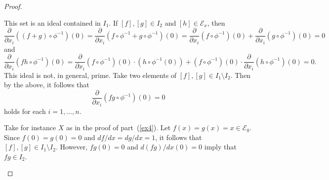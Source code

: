 \documentclass[10pt]{amsart}
\begin{document}
\begin{thm}
\begin{proof}
\begin{enumerate}
      This set is an ideal contained in $I_1$.
      If $[f], [g] \in I_2$ and $[h] \in \mathcal{E}_x$, then
      $$\frac{\partial}{\partial x_i}((f + g) \circ \phi^{-1})(0) = \frac{\partial}{\partial x_i}(f\circ \phi^{-1} + g \circ \phi^{-1})(0) = \frac{\partial}{\partial x_i}(f \circ \phi^{-1})(0) + \frac{\partial}{\partial x_i}(g\circ \phi^{-1})(0) = 0$$
      and
      $$\frac{\partial}{\partial x_i} (fh\circ\phi^{-1})(0) = \frac{\partial}{\partial x_i} (f\circ \phi^{-1})(0) \cdot (h \circ\phi^{-1}(0)) + (f\circ \phi^{-1})(0) \cdot \frac{\partial}{\partial x_i} (h \circ\phi^{-1})(0) = 0.$$
      This ideal is not, in general, prime.
      Take two elements of $[f], [g] \in I_1 \setminus I_2$.
      Then by the above, it follows that 
      $$\frac{\partial}{\partial x_i} (fg \circ \phi^{-1})(0) = 0$$
      holds for each $i = 1, \ldots, n$.

      Take for instance $X$ as in the proof of part~(\ref{ex4}).
      Let $f(x) = g(x) = x \in \mathcal{E}_0$.
      Since $f(0) = g(0) = 0$ and $df/dx = dg/dx = 1$, it follows that $[f], [g] \in I_1 \setminus I_2$.
      However, $fg(0) = 0$ and $d(fg)/dx(0)= 0$ imply that $fg \in I_2$.
    \end{enumerate}
  \end{proof}
\end{thm}
\end{document}
